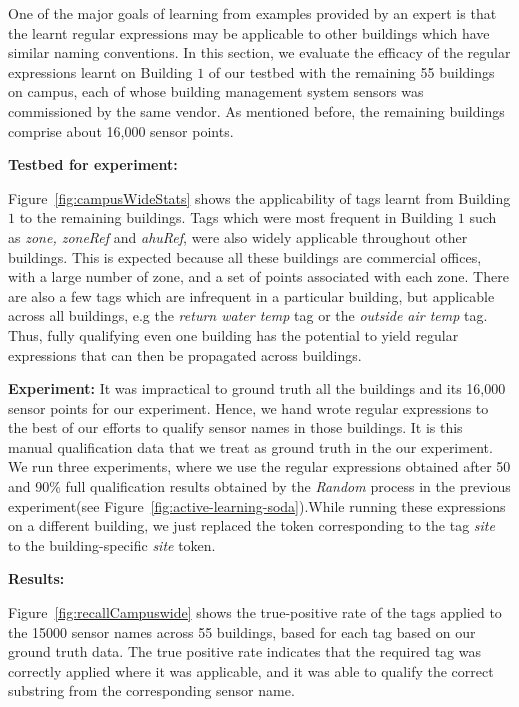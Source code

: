 One of the major goals of learning from examples provided by an expert is that the learnt regular expressions may be applicable to other buildings which have similar naming conventions. In this section, we evaluate the efficacy of the regular expressions learnt on Building $1$ of our testbed with the remaining 55 buildings on campus, each of whose building management system sensors was commissioned by the same vendor. As mentioned before, the remaining buildings comprise about 16,000 sensor points.

{\bf Testbed for experiment:}

Figure~\ref{fig:campusWideStats} shows the applicability of tags learnt from Building $1$ to the remaining buildings. Tags which were most frequent in Building $1$ such as {\it zone, zoneRef} and {\it ahuRef}, were also widely applicable throughout other buildings. This is expected because all these buildings are commercial offices, with a large number of zone, and a set of points associated with each zone. There are also a few tags which are infrequent in a particular building, but applicable across all buildings, e.g the {\it return water temp} tag or the {\it outside air temp} tag. Thus, fully qualifying even one building has the potential to yield regular expressions that can then be propagated across buildings.

{\bf Experiment:}
It was impractical to ground truth all the buildings and its 16,000 sensor points for our experiment. Hence, we hand wrote regular expressions to the best of our efforts to qualify sensor names in those buildings. It is this manual qualification data that we treat as ground truth in the our experiment. We run three experiments, where we use the regular expressions obtained after 50 and 90\% full qualification results obtained by the {\it Random} process in the previous experiment(see Figure~\ref{fig:active-learning-soda}).While running these expressions on a different building, we just replaced the token corresponding to the tag {\it site} to the building-specific {\it site}  token. 

{\bf Results:}

Figure~\ref{fig:recallCampuswide} shows the true-positive rate of the tags applied to the 15000 sensor names across 55 buildings, based for each tag based on our ground truth data. The true positive rate indicates that the required tag was correctly applied where it was applicable, and it was able to qualify the correct substring from the corresponding sensor name. 

